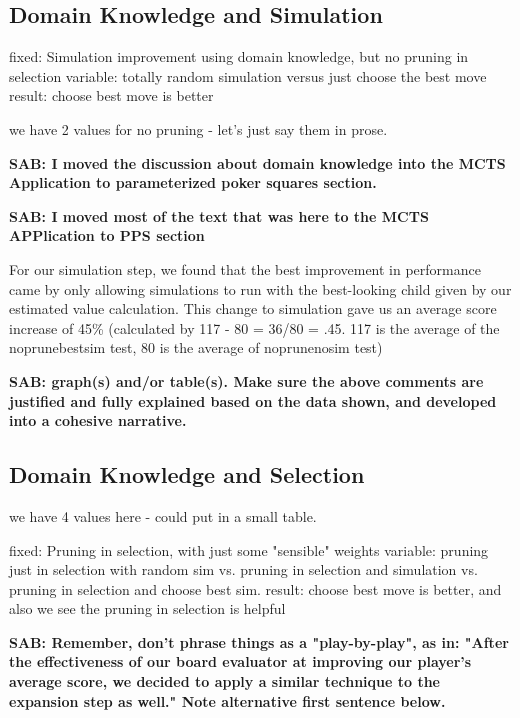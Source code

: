 \documentclass[letterpaper]{article}
\begin{document}
\subsection{Domain Knowledge and Simulation}

fixed: Simulation improvement using domain knowledge, but no pruning in selection
variable: totally random simulation versus just choose the best move 
result: choose best move is better

we have 2 values for no pruning - let's just say them in prose.


{\bf SAB: I moved the discussion about domain knowledge into the MCTS Application to parameterized poker squares section.}

{\bf SAB: I moved most of the text that was here to the MCTS APPlication to PPS section}

For our simulation step, we found that the best improvement in performance came by only allowing simulations to run with the best-looking child given by our estimated value calculation. This change to simulation gave us an average score increase of 45\% (calculated by 117 - 80 = 36/80 = .45. 117 is the average of the noprunebestsim test, 80 is the average of noprunenosim test)

{\bf SAB: graph(s) and/or table(s). Make sure the above comments are justified and fully explained based on the data shown, and developed into a cohesive narrative.}

\subsection{Domain Knowledge and Selection}

we have 4 values here - could put in a small table.

fixed: Pruning in selection, with just some "sensible" weights
variable: pruning just in selection with random sim vs. pruning in selection and simulation vs. pruning in selection and choose best sim.
result: choose best move is better, and also we see the pruning in selection is helpful

{\bf SAB: Remember, don't phrase things as a "play-by-play", as in: "After the effectiveness of our board evaluator at improving our player’s average score, we decided to apply a similar technique to the expansion step as well." Note alternative first sentence below.}
\end{document}
